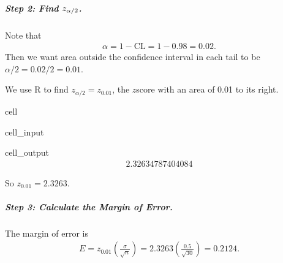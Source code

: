 \documentclass[letterpaper,10pt,english]{jupyterBook}
\begin{document}
\subparagraph{Step 2: Find \protect\(z_{\alpha/2}\protect\).}
\label{\detokenize{Ch5 Confidence Intervals/5.1 Estimating Population Means (Sigma Known):id4}}
\sphinxAtStartPar
Note that
\begin{equation*}
\begin{split}\alpha = 1 - \text{CL} = 1 - 0.98 = 0.02. \end{split}
\end{equation*}
\sphinxAtStartPar
Then we want area outside the confidence interval in each tail to be \(\alpha/2 = 0.02/2 = 0.01\).

\sphinxAtStartPar
We use R to find \(z_{\alpha/2} = z_{0.01}\), the \(z\)\sphinxhyphen{}score with an area of 0.01 to its right.

\begin{sphinxuseclass}{cell}\begin{sphinxVerbatimInput}

\begin{sphinxuseclass}{cell_input}
\begin{sphinxVerbatim}[commandchars=\\\{\}]
\end{sphinxVerbatim}

\end{sphinxuseclass}\end{sphinxVerbatimInput}
\begin{sphinxVerbatimOutput}

\begin{sphinxuseclass}{cell_output}\begin{equation*}
\begin{split}2.32634787404084\end{split}
\end{equation*}
\end{sphinxuseclass}\end{sphinxVerbatimOutput}

\end{sphinxuseclass}
\sphinxAtStartPar
So \(z_{0.01} = 2.3263\).


\subparagraph{Step 3: Calculate the Margin of Error.}
\label{\detokenize{Ch5 Confidence Intervals/5.1 Estimating Population Means (Sigma Known):id5}}
\sphinxAtStartPar
The margin of error is
\begin{equation*}
\begin{split}E = z_{0.01}\left(\frac{\sigma}{\sqrt{n}}\right) = 2.3263\left(\frac{0.5}{\sqrt{30}}\right) = 0.2124.\end{split}
\end{equation*}
\end{document}
